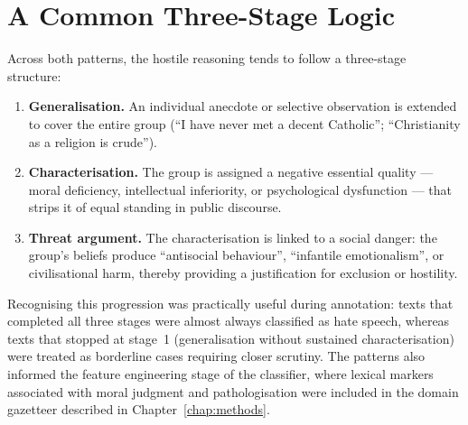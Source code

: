 \documentclass[../CLthesis.tex]{subfiles}
\begin{document}
\section{A Common Three-Stage Logic}
\label{sec:annotation-logic}

Across both patterns, the hostile reasoning tends to follow a three-stage structure:

\begin{enumerate}
  \item \textbf{Generalisation.} An individual anecdote or selective observation is extended to cover the entire group (``I have never met a decent Catholic''; ``Christianity as a religion is crude'').
  \item \textbf{Characterisation.} The group is assigned a negative essential quality --- moral deficiency, intellectual inferiority, or psychological dysfunction --- that strips it of equal standing in public discourse.
  \item \textbf{Threat argument.} The characterisation is linked to a social danger: the group's beliefs produce ``antisocial behaviour'', ``infantile emotionalism'', or civilisational harm, thereby providing a justification for exclusion or hostility.
\end{enumerate}

Recognising this progression was practically useful during annotation: texts that completed all three stages were almost always classified as hate speech, whereas texts that stopped at stage~1 (generalisation without sustained characterisation) were treated as borderline cases requiring closer scrutiny. The patterns also informed the feature engineering stage of the classifier, where lexical markers associated with moral judgment and pathologisation were included in the domain gazetteer described in Chapter~\ref{chap:methods}.

\subfilebibliography
\end{document}
